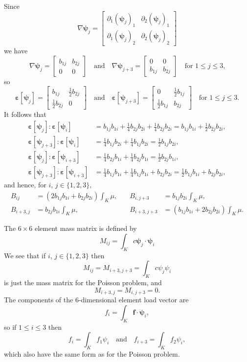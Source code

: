 \documentclass[a4paper,12pt]{article}
\newcommand{\bs}[1]{\boldsymbol{#1}}
\begin{document}
Since
\[
\nabla\bs{\psi}_j=\begin{bmatrix}
\partial_1(\bs{\psi}_j)_1&\partial_2(\bs{\psi}_j)_1 \\           
\partial_1(\bs{\psi}_j)_2&\partial_2(\bs{\psi}_j)_2\end{bmatrix}
\]
we have
\[
\nabla\bs{\psi}_j=\begin{bmatrix}
b_{1j}&b_{2j}\\0&0\end{bmatrix}
\quad\text{and}\quad
\nabla\bs{\psi}_{j+3}=\begin{bmatrix}
0&0\\b_{1j}&b_{2j}\end{bmatrix}
\quad\text{for $1\le j\le 3$,}
\]
so
\[
\bs{\varepsilon}[\bs{\psi}_j]=\begin{bmatrix}
b_{1j}&\tfrac12b_{2j}\\
\tfrac12b_{2j}&0 \end{bmatrix}
\quad\text{and}\quad
\bs{\varepsilon}[\bs{\psi}_{j+3}]=\begin{bmatrix}
0&\tfrac12b_{1j}\\
\tfrac12b_{1j}&b_{2j} \end{bmatrix}\quad\text{for $1\le j\le 3$.}
\]
It follows that
\begin{align*}
\bs{\varepsilon}[\bs{\psi}_j]:\bs{\varepsilon}[\bs{\psi}_i]
    &=b_{1j}b_{1i}+\tfrac14b_{2j}b_{2i}+\tfrac14b_{2j}b_{2i}
    =b_{1j}b_{1i}+\tfrac12 b_{2j}b_{2i},\\
\bs{\varepsilon}[\bs{\psi}_{j+3}]:\bs{\varepsilon}[\bs{\psi}_i]
    &=\tfrac14b_{1j}b_{2i}+\tfrac14b_{1j}b_{2i}=\tfrac12b_{1j}b_{2i},\\
\bs{\varepsilon}[\bs{\psi}_j]:\bs{\varepsilon}[\bs{\psi}_{i+3}]
    &=\tfrac14b_{2j}b_{1i}+\tfrac14b_{2j}b_{1i}=\tfrac12b_{2j}b_{1i},\\
\bs{\varepsilon}[\bs{\psi}_{j+3}]:\bs{\varepsilon}[\bs{\psi}_{i+3}]
    &=\tfrac14b_{1j}b_{1i}+\tfrac14b_{1j}b_{1i}+b_{2j}b_{2i}
    =\tfrac12b_{1j}b_{1i}+b_{2j}b_{2i},
\end{align*}
and hence, for $i$, $j\in\{1,2,3\}$,
\[
\begin{aligned}
B_{ij}&=(2b_{1j}b_{1i}+b_{2j}b_{2i})\int_K\mu,&\quad
B_{i,j+3}&=b_{1j}b_{2i}\int_K\mu,\\
B_{i+3,j}&=b_{2j}b_{1i}\int_K\mu,&\quad
B_{i+3,j+3}&=(b_{1j}b_{1i}+2b_{2j}b_{2i})\int_K\mu.
\end{aligned}
\]

The $6\times6$ element mass matrix is defined by
\begin{equation}\label{eq: elasticity M}
M_{ij}=\int_K c\bs{\psi}_j\cdot\bs{\psi}_i
\end{equation}
We see that if $i$, $j\in\{1,2,3\}$ then
\[
M_{ij}=M_{i+3,j+3}=\int_Kc\psi_j\psi_i
\]
is just the mass matrix for the Poisson problem, and 
\[
M_{i+3,j}=M_{i,j+3}=0.
\]
The components of the $6$-dimensional element load vector are
\begin{equation}\label{eq: elasticity load vec}
f_i=\int_K\bs{f}\cdot{\bs{\psi}_i},
\end{equation}
so if $1\le i\le3$ then
\[
f_i=\int_Kf_1\psi_i\quad\text{and}\quad
f_{i+3}=\int_Kf_2\psi_i,
\]
which also have the same form as for the Poisson problem.
\end{document}
